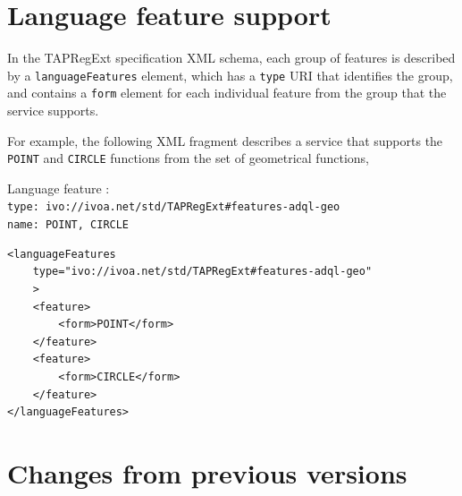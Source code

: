 \documentclass[11pt,a4paper]{ivoa}
\newcommand{\TAPRegExtSpec}{TAPRegExt specification\xspace}
\begin{document}
\newpage
\section{Language feature support}
\label{sec:features}

In the \TAPRegExtSpec XML schema, each group of features is
described by a \verb:languageFeatures: element, which has a \verb:type:
URI that identifies the group, and contains a \verb:form: element for each
individual feature from the group that the service supports.

For example, the following XML fragment describes a service that supports the
\verb:POINT: and \verb:CIRCLE: functions from the set of geometrical functions,

{\footnotesize Language feature :}\\
{\footnotesize \verb|type: ivo://ivoa.net/std/TAPRegExt#features-adql-geo|}\\
{\footnotesize \verb|name: POINT, CIRCLE|}\\

\begin{verbatim}
<languageFeatures
    type="ivo://ivoa.net/std/TAPRegExt#features-adql-geo"
    >
    <feature>
        <form>POINT</form>
    </feature>
    <feature>
        <form>CIRCLE</form>
    </feature>
</languageFeatures>    
\end{verbatim}

\newpage
\section{Changes from previous versions}
\label{sec:changes}
\end{document}

